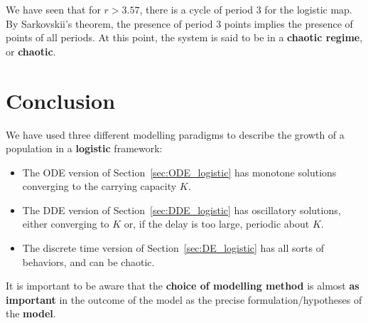 We have seen that for $r>3.57$, there is a cycle of period 3 for the logistic map. By Sarkovskii's theorem, the presence of period 3 points implies the presence of points of all periods.
At this point, the system is said to be in a \textbf{chaotic regime}, or \textbf{chaotic}.




\section{Conclusion}

We have used three different modelling paradigms to describe the growth of a population in a \textbf{logistic} framework:
\begin{itemize}
\item The ODE version of Section~\ref{sec:ODE_logistic} has monotone solutions converging to the carrying capacity $K$.
\item The DDE version of Section~\ref{sec:DDE_logistic} has oscillatory solutions, either converging to $K$ or, if the delay is too large, periodic about $K$.
\item The discrete time version of Section~\ref{sec:DE_logistic} has all sorts of behaviors, and can be chaotic.
\end{itemize}
It is important to be aware that the {\bf choice of modelling method} is almost {\bf as important} in the outcome of the model as the precise formulation/hypotheses of the {\bf model}.


%
%
%
%
%
%
